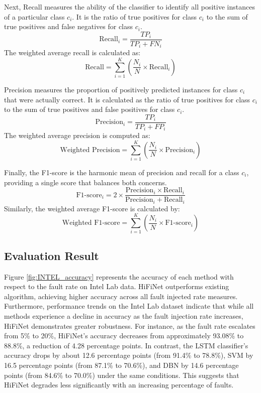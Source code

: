 Next, Recall measures the ability of the classifier to identify all positive instances of a particular class \(c_i\). It is the ratio of true positives for class \(c_i\) to the sum of true positives and false negatives for class \(c_i\).
\[\text{Recall}_i = \frac{TP_i}{TP_i + FN_i}\]
The weighted average recall is calculated as:
\[\text{Recall} = \sum_{i=1}^{K} \left( \frac{N_i}{N} \times \text{Recall}_i \right)\]

Precision measures the proportion of positively predicted instances for class \(c_i\) that were actually correct. It is calculated as the ratio of true positives for class \(c_i\) to the sum of true positives and false positives for class \(c_i\).
\[\text{Precision}_i = \frac{TP_i}{TP_i + FP_i}\]
The weighted average precision is computed as:
\[\text{Weighted Precision} = \sum_{i=1}^{K} \left( \frac{N_i}{N} \times \text{Precision}_i \right)\]

Finally, the F1-score is the harmonic mean of precision and recall for a class \(c_i\), providing a single score that balances both concerns.
\[\text{F1-score}_i = 2 \times \frac{\text{Precision}_i \times \text{Recall}_i}{\text{Precision}_i + \text{Recall}_i} \]
Similarly, the weighted average F1-score is calculated by:
\[\text{Weighted F1-score} = \sum_{i=1}^{K} \left( \frac{N_i}{N} \times \text{F1-score}_i \right)\]

\subsection{Evaluation Result}
Figure \ref{fig:INTEL_accuracy} represents the accuracy of each method with respect to the fault rate on Intel Lab data. HiFiNet outperforms existing algorithm, achieving higher accuracy across all fault injected rate measures. Furthermore, performance trends on the Intel Lab dataset indicate that while all methods experience a decline in accuracy as the fault injection rate increases, HiFiNet demonstrates greater robustness. For instance, as the fault rate escalates from 5\% to 20\%, HiFiNet's accuracy decreases from approximately 93.08\% to 88.8\%, a reduction of 4.28 percentage points. In contrast, the LSTM classifier's accuracy drops by about 12.6 percentage points (from 91.4\% to 78.8\%), SVM by 16.5 percentage points (from 87.1\% to 70.6\%), and DBN by 14.6 percentage points (from 84.6\% to 70.0\%) under the same conditions. This suggests that HiFiNet degrades less significantly with an increasing percentage of faults.

